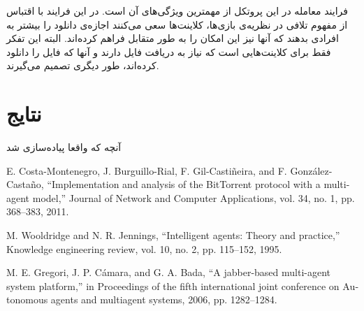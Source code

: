\documentclass{article}
\begin{document}
فرایند معامله در این پروتکل از مهمترین ویژگی‌های آن است. در این فرایند با اقتباس از مفهوم تلافی در نظریه‌ی بازی‌ها، کلاینت‌ها سعی می‌کنند اجازه‌ی دانلود را بیشتر به افرادی بدهند که آنها نیز این امکان را به طور متقابل فراهم کرده‌اند. البته این تفکر فقط برای کلاینت‌هایی است که نیاز به دریافت فایل دارند و آنها که فایل را دانلود کرده‌اند، طور دیگری تصمیم می‌گیرند.

\section{نتایج}
آنچه که واقعا پیاده‌سازی شد


\renewcommand*{\refname}{\section{منابع}}
\begin{thebibliography}{9}
\begin{latin}

E. Costa-Montenegro, J. Burguillo-Rial, F. Gil-Castiñeira, and F. González-Castaño, “Implementation and analysis of the BitTorrent protocol with a multi-agent model,” Journal of Network and Computer Applications, vol. 34, no. 1, pp. 368–383, 2011.

M. Wooldridge and N. R. Jennings, “Intelligent agents: Theory and practice,” Knowledge engineering review, vol. 10, no. 2, pp. 115–152, 1995.

M. E. Gregori, J. P. Cámara, and G. A. Bada, “A jabber-based multi-agent system platform,” in Proceedings of the fifth international joint conference on Autonomous agents and multiagent systems, 2006, pp. 1282–1284.

\end{latin}
\end{thebibliography}
\end{document}
